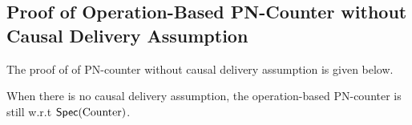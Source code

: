 





\subsection{Proof of Operation-Based PN-Counter without Causal Delivery Assumption}
\label{subsec:proof of operation-based PN-counter without causal delivery assumption}

The proof of \crdtlin{} of PN-counter without causal delivery assumption is given below. %

\begin{lemma}
\label{lemma:when there is no causal delivery assumption, the operation-based PN-counter is still correct}
When there is no causal delivery assumption, the operation-based PN-counter is still \crdtlinearizable{} w.r.t $\mathsf{Spec}(\text{Counter})$.
\end{lemma}

